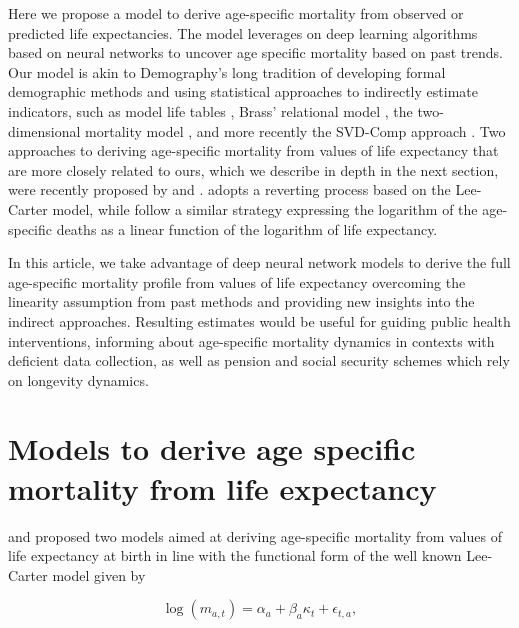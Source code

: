 \documentclass[a4,11pt]{article}
\begin{document}
Here we propose a model to derive age-specific mortality from observed or predicted life expectancies. The model leverages on deep learning algorithms based on neural networks to uncover age specific mortality based on past trends. Our model is akin to Demography's long tradition of developing formal demographic methods and using statistical approaches to indirectly estimate indicators, such as model life tables \citep{UN_1955,UN_1967,murray2003}, Brass’ relational model \citep{brass1968,brass1971}, the two-dimensional mortality model \citep{wilmoth2012}, and more recently the SVD-Comp approach \citep{clark2019GeneralAgeSpecificMortality}. Two approaches to deriving age-specific mortality from values of life expectancy that are more closely related to ours, which we describe in depth in the next section, were recently proposed by \cite{Sevcikova} and \cite{PascariuLL}. \cite{Sevcikova} adopts a reverting process based on the Lee-Carter model, while \cite{PascariuLL} follow a similar strategy expressing the logarithm of the age-specific deaths as a linear function of the logarithm of life expectancy. 

In this article, we take advantage of deep neural network models to derive the full age-specific mortality profile from values of life expectancy overcoming the linearity assumption from past methods and providing new insights into the indirect approaches. Resulting estimates would be useful for guiding public health interventions, informing about age-specific mortality dynamics in contexts with deficient data collection, as well as pension and social security schemes which rely on longevity dynamics. 



\section{Models to derive age specific mortality from life expectancy}

 \cite{Sevcikova} and \cite{PascariuLL} proposed two models aimed at deriving age-specific mortality from values of life expectancy at birth in line with the functional form of the well known Lee-Carter model \citep{LC1992} given by 
 
	\begin{equation} 
	\label{eq.Lee-carter}
	\log{\left(m_{a,t}\right)}=\alpha_{a}+\beta_{a} \kappa_{t} + \epsilon_{t,a}, 
	\end{equation}
%
\end{document}
